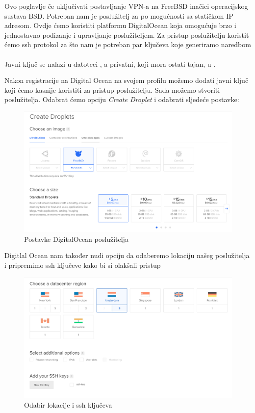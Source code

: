 Ovo poglavlje če uključivati postavljanje VPN-a na FreeBSD inačici operacijskog
sustava BSD. 
    Potreban nam je poslužitelj za po mogućnosti sa statičkom IP adresom. Ovdje
    ćemo koristiti platformu DigitalOcean koja omogućuje brzo i jednostavno
    podizanje i upravljanje poslužiteljem. Za pristup poslužitelju koristit ćemo
    ssh protokol za što nam je potreban par ključeva koje generiramo naredbom \\

    \noindent
     \\

    \noindent
    Javni ključ se nalazi u datoteci , a privatni, koji
    mora ostati tajan, u .

    Nakon registracije na Digital Ocean na svojem profilu možemo dodati javni ključ
    koji ćemo kasnije koristiti za pristup poslužitelju. Sada možemo stvoriti
    poslužitelja. Odabrat ćemo opciju
    \textit{Create Droplet} i odabrati sljedeće postavke:

    \begin{figure}[h]
        \centering
        \includegraphics[scale=0.35]{slike/postavkeDOserver}
        \caption{Postavke DigitalOcean poslužitelja}
    \end{figure}

    \newpage
    \noindent
    Digitlal Ocean nam također nudi opciju da odaberemo lokaciju našeg poslužitelja
    i pripremimo ssh ključeve kako bi si olakšali pristup
    \begin{figure}[h]
        \centering
        \includegraphics[scale=0.15]{slike/lokacijaIssh}
        \caption{Odabir lokacije i ssh ključeva}
    \end{figure}

